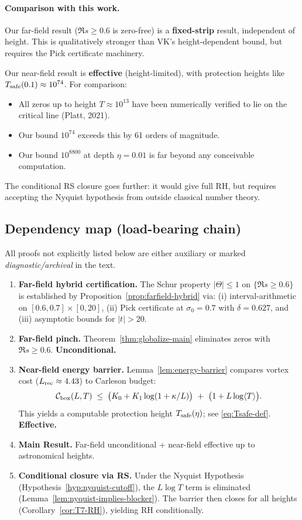 \documentclass[11pt]{article}
\theoremstyle{definition}
\theoremstyle{remark}
\theoremstyle{definition}
\begin{document}
\paragraph{Comparison with this work.}
Our far-field result ($\Re s \ge 0.6$ is zero-free) is a \textbf{fixed-strip} result, independent of height. This is qualitatively stronger than VK's height-dependent bound, but requires the Pick certificate machinery.

Our near-field result is \textbf{effective} (height-limited), with protection heights like $T_{\rm safe}(0.1) \approx 10^{74}$. For comparison:
\begin{itemize}
\item All zeros up to height $T \approx 10^{13}$ have been numerically verified to lie on the critical line (Platt, 2021).
\item Our bound $10^{74}$ exceeds this by 61 orders of magnitude.
\item Our bound $10^{8800}$ at depth $\eta = 0.01$ is far beyond any conceivable computation.
\end{itemize}
The conditional RS closure goes further: it would give full RH, but requires accepting the Nyquist hypothesis from outside classical number theory.

\subsection*{Dependency map (load-bearing chain)}
All proofs not explicitly listed below are either auxiliary or marked \emph{diagnostic/archival} in the text.
\begin{enumerate}
\item \textbf{Far-field hybrid certification.} The Schur property $|\Theta| \le 1$ on $\{\Re s \ge 0.6\}$ is established by Proposition~\ref{prop:farfield-hybrid} via: (i) interval-arithmetic on $[0.6, 0.7] \times [0, 20]$, (ii) Pick certificate at $\sigma_0 = 0.7$ with $\delta = 0.627$, and (iii) asymptotic bounds for $|t| > 20$.
\item \textbf{Far-field pinch.} Theorem~\ref{thm:globalize-main} eliminates zeros with $\Re s\ge 0.6$. \textbf{Unconditional.}
\item \textbf{Near-field energy barrier.} Lemma~\ref{lem:energy-barrier} compares vortex cost ($L_{\rm rec} \approx 4.43$) to Carleson budget:
\[
  \mathcal{C}_{\rm box}(L, T) \;\le\; \big(K_0 + K_1\log(1+\kappa/L)\big)\ +\ \big(1 + L\log\langle T\rangle\big).
\]
This yields a computable protection height $T_{\rm safe}(\eta)$; see \eqref{eq:Tsafe-def}. \textbf{Effective.}
\item \textbf{Main Result.} Far-field unconditional + near-field effective up to astronomical heights.
\item \textbf{Conditional closure via RS.} Under the Nyquist Hypothesis (Hypothesis~\ref{hyp:nyquist-cutoff}), the $L\log T$ term is eliminated (Lemma~\ref{lem:nyquist-implies-blocker}). The barrier then closes for all heights (Corollary~\ref{cor:T7-RH}), yielding RH conditionally.
\end{enumerate}
\end{document}
